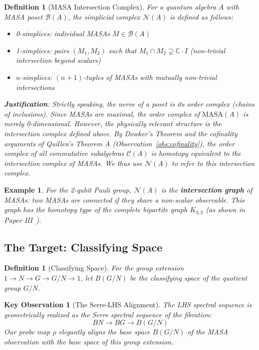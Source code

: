 \documentclass[11pt]{article}
\newtheorem{definition}[theorem]{Definition}
\newtheorem{keyobservation}[theorem]{Key Observation}
\newtheorem{example}[theorem]{Example}
\begin{document}
\begin{definition}[MASA Intersection Complex]\label{def:masa-nerve}
For a quantum algebra $A$ with MASA poset $\mathcal{B}(A)$, the simplicial complex $\mathcal{N}(A)$ is defined as follows:
\begin{itemize}
\item \emph{0-simplices}: individual MASAs $M \in \mathcal{B}(A)$
\item \emph{1-simplices}: pairs $(M_1, M_2)$ such that $M_1 \cap M_2 \supsetneq \mathbb{C} \cdot I$ (non-trivial intersection beyond scalars)
\item \emph{$n$-simplices}: $(n+1)$-tuples of MASAs with mutually non-trivial intersections
\end{itemize}

\textbf{Justification}: Strictly speaking, the nerve of a poset is its order complex (chains of inclusions). Since MASAs are maximal, the order complex of $\text{MASA}(A)$ is merely 0-dimensional. However, the physically relevant structure is the \emph{intersection complex} defined above. By Dowker's Theorem and the cofinality arguments of Quillen's Theorem A (Observation~\ref{obs:cofinality}), the order complex of all commutative subalgebras $\mathcal{C}(A)$ is homotopy equivalent to the intersection complex of MASAs. We thus use $\mathcal{N}(A)$ to refer to this intersection complex.
\end{definition}

\begin{example}\label{ex:nerve}
For the 2-qubit Pauli group, $\mathcal{N}(A)$ is the \textbf{intersection graph} of MASAs: two MASAs are connected if they share a non-scalar observable. This graph has the homotopy type of the complete bipartite graph $K_{3,3}$ (as shown in Paper III~\cite{PaperIII}).
\end{example}

\subsection{The Target: Classifying Space}
\label{target}

\begin{definition}[Classifying Space]\label{def:classifying}
For the group extension $1 \to N \to G \to G/N \to 1$, let $B(G/N)$ be the classifying space of the quotient group $G/N$.
\end{definition}

\begin{keyobservation}[The Serre-LHS Alignment]\label{obs:serre-lhs}
The LHS spectral sequence is geometrically realized as the Serre spectral sequence of the fibration:
\[
BN \longrightarrow BG \longrightarrow B(G/N)
\]
Our probe map $\rho$ elegantly aligns the base space $B(G/N)$ of the MASA observation with the base space of this group extension.
\end{keyobservation}
\end{document}
